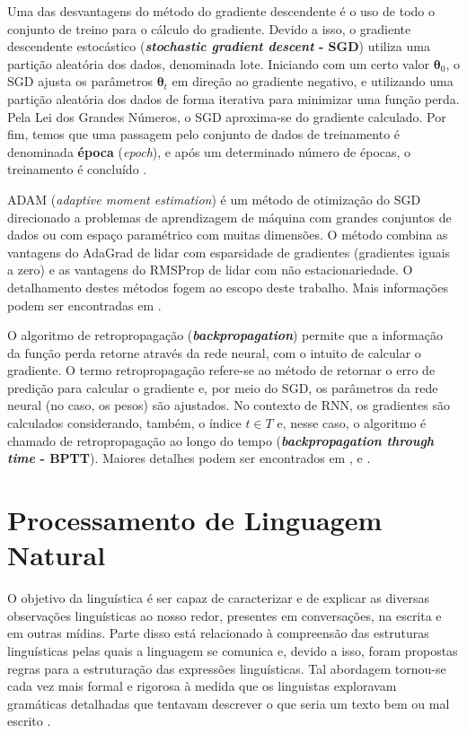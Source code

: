 \documentclass[twoside]{automatextcc}
\newcommand{\bs}[1]{\boldsymbol{#1}}
\begin{document}
Uma das desvantagens  do método do gradiente descendente é o uso de todo o conjunto de treino para o cálculo do gradiente. Devido a isso, o gradiente descendente estocástico (\textbf{\textit{stochastic gradient descent} - SGD}) utiliza uma partição aleatória dos dados, denominada lote. Iniciando com um certo valor $\bs{\theta}_0$, o SGD ajusta os parâmetros $\bs{\theta}_t$ em direção ao gradiente negativo, e utilizando uma partição aleatória dos dados de forma iterativa para minimizar uma função perda. Pela Lei dos Grandes Números, o SGD aproxima-se do gradiente calculado. Por fim, temos que uma passagem pelo conjunto de dados de treinamento é denominada \textbf{época} (\textit{epoch}), e após um determinado número de épocas, o treinamento é concluído \citep{goodfellow2016, kamath2019, fan2021}. 

ADAM (\textit{adaptive moment estimation}) é um método de otimização do SGD direcionado a problemas de aprendizagem de máquina com grandes conjuntos de dados ou com espaço paramétrico com muitas dimensões. O método combina as vantagens do AdaGrad \citep{duchi2011} de lidar com esparsidade de gradientes (gradientes iguais a zero) e as vantagens do RMSProp \citep{tieleman2012} de lidar com não estacionariedade. O detalhamento destes métodos fogem ao escopo deste trabalho. Mais informações podem ser encontradas em \citet{kingma2014}.

O algoritmo de retropropagação (\textbf{\textit{backpropagation}}) permite que a informação da função perda retorne através da rede neural, com o intuito de calcular o gradiente. O termo retropropagação refere-se ao método de retornar o erro de predição para calcular o gradiente e, por meio do SGD, os parâmetros da rede neural (no caso, os pesos) são ajustados. No contexto de RNN, os gradientes são calculados considerando, também, o índice $t \in T$ e, nesse caso, o algoritmo é chamado de retropropagação ao longo do tempo (\textbf{\textit{backpropagation through time} - BPTT}). Maiores detalhes podem ser encontrados em \citet{haykin2009}, \citet{goodfellow2016} e \citet{fan2021}.  



\section{Processamento de Linguagem Natural}
O objetivo da linguística é ser capaz de caracterizar e de explicar as diversas observações linguísticas ao nosso redor, presentes em conversações, na escrita e em outras mídias. Parte disso está relacionado à compreensão das estruturas linguísticas pelas quais a linguagem se comunica e, devido a isso, foram propostas regras para a estruturação das expressões linguísticas. Tal abordagem tornou-se cada vez mais formal e rigorosa à medida que os linguistas exploravam gramáticas detalhadas que tentavam descrever o que seria um texto bem ou mal escrito \citep{manning1999}.
\end{document}
